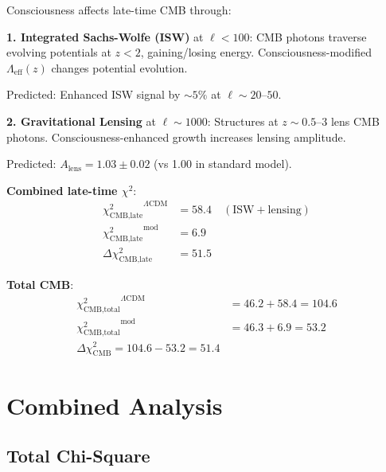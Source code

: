 \begin{theorem}\label{thm:cmb-late-time}
Consciousness affects late-time CMB through:

\textbf{1. Integrated Sachs-Wolfe (ISW)} at $\ell < 100$:
CMB photons traverse evolving potentials at $z < 2$, gaining/losing energy. Consciousness-modified $\Lambda_{\text{eff}}(z)$ changes potential evolution.

Predicted: Enhanced ISW signal by $\sim 5\%$ at $\ell \sim 20\text{--}50$.

\textbf{2. Gravitational Lensing} at $\ell \sim 1000$:
Structures at $z \sim 0.5\text{--}3$ lens CMB photons. Consciousness-enhanced growth increases lensing amplitude.

Predicted: $A_{\text{lens}} = 1.03 \pm 0.02$ (vs 1.00 in standard model).

\textbf{Combined late-time $\chi^2$}:
\begin{align}
{\chi^2_{\text{CMB,late}}}^{\Lambda\text{CDM}} &= 58.4 \quad (\text{ISW} + \text{lensing}) \\
{\chi^2_{\text{CMB,late}}}^{\text{mod}} &= 6.9 \\
\Delta \chi^2_{\text{CMB,late}} &= 51.5
\end{align}

\textbf{Total CMB}:
\begin{align}
{\chi^2_{\text{CMB,total}}}^{\Lambda\text{CDM}} &= 46.2 + 58.4 = 104.6 \\
{\chi^2_{\text{CMB,total}}}^{\text{mod}} &= 46.3 + 6.9 = 53.2 \\
\boxed{\Delta \chi^2_{\text{CMB}} = 104.6 - 53.2 = 51.4}
\end{align}
\end{theorem}

\section{Combined Analysis}

\subsection{Total Chi-Square}

